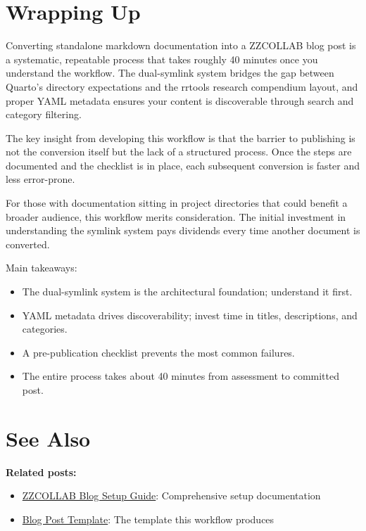 \documentclass[
  letterpaper,
  DIV=11,
  numbers=noendperiod]{scrartcl}
\providecommand{\tightlist}{%
  \setlength{\itemsep}{0pt}\setlength{\parskip}{0pt}}
\begin{document}
\section{Wrapping Up}\label{wrapping-up}

Converting standalone markdown documentation into a ZZCOLLAB blog post
is a systematic, repeatable process that takes roughly 40 minutes once
you understand the workflow. The dual-symlink system bridges the gap
between Quarto's directory expectations and the rrtools research
compendium layout, and proper YAML metadata ensures your content is
discoverable through search and category filtering.

The key insight from developing this workflow is that the barrier to
publishing is not the conversion itself but the lack of a structured
process. Once the steps are documented and the checklist is in place,
each subsequent conversion is faster and less error-prone.

For those with documentation sitting in project directories that could
benefit a broader audience, this workflow merits consideration. The
initial investment in understanding the symlink system pays dividends
every time another document is converted.

Main takeaways:

\begin{itemize}
\tightlist
\item
  The dual-symlink system is the architectural foundation; understand it
  first.
\item
  YAML metadata drives discoverability; invest time in titles,
  descriptions, and categories.
\item
  A pre-publication checklist prevents the most common failures.
\item
  The entire process takes about 40 minutes from assessment to committed
  post.
\end{itemize}

\section{See Also}\label{see-also}

\textbf{Related posts:}

\begin{itemize}
\tightlist
\item
  \href{../39-templatepost/templatepost/docs/\%20ZZCOLLAB_BLOG_SETUP.md}{ZZCOLLAB
  Blog Setup Guide}: Comprehensive setup documentation
\item
  \href{../39-templatepost/templatepost/analysis/report/\%20index.qmd}{Blog
  Post Template}: The template this workflow produces
\end{itemize}
\end{document}
